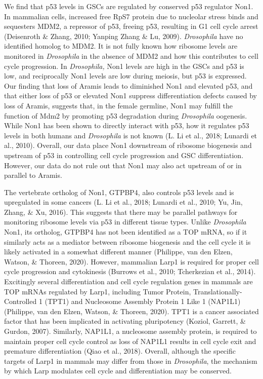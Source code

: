 \documentclass[12pt,oneside]{reedthesis}
\begin{document}
We find that p53 levels in GSCs are regulated by conserved p53 regulator
Non1. In mammalian cells, increased free RpS7 protein due to nucleolar
stress binds and sequesters MDM2, a repressor of p53, freeing p53,
resulting in G1 cell cycle arrest (Deisenroth \& Zhang, 2010; Yanping Zhang \& Lu, 2009). \emph{Drosophila} have no identified
homolog to MDM2. It is not fully known how ribosome levels are monitored
in \emph{Drosophila} in the absence of MDM2 and how this contributes to cell
cycle progression. In \emph{Drosophila,} Non1 levels are high in the GSCs and
p53 is low, and reciprocally Non1 levels are low during meiosis, but p53
is expressed. Our finding that loss of Aramis leads to diminished Non1
and elevated p53, and that either loss of p53 or elevated Non1 suppress
differentiation defects caused by loss of Aramis, suggests that, in the
female germline, Non1 may fulfill the function of Mdm2 by promoting p53
degradation during \emph{Drosophila} oogenesis. While Non1 has been shown to
directly interact with p53, how it regulates p53 levels in both humans
and \emph{Drosophila} is not known (L. Li et al., 2018; Lunardi et al., 2010). Overall,
our data place Non1 downstream of ribosome biogenesis and upstream of
p53 in controlling cell cycle progression and GSC differentiation.
However, our data do not rule out that Non1 may also act upstream of or
in parallel to Aramis.

The vertebrate ortholog of Non1, GTPBP4, also controls p53 levels and is
upregulated in some cancers (L. Li et al., 2018; Lunardi et al., 2010; Yu, Jin, Zhang, \& Xu, 2016). This suggests that there may be
parallel pathways for monitoring ribosome levels via p53 in different
tissue types. Unlike \emph{Drosophila} Non1, its ortholog, GTPBP4 has not
been identified as a TOP mRNA, so if it similarly acts as a mediator
between ribosome biogenesis and the cell cycle it is likely activated in
a somewhat different manner (Philippe, van den Elzen, Watson, \& Thoreen, 2020).
However, mammalian Larp1 is required for proper cell cycle progression
and cytokinesis (Burrows et al., 2010; Tcherkezian et al., 2014).
Excitingly several differentiation and cell cycle regulation genes in
mammals are TOP mRNAs regulated by Larp1, including Tumor Protein,
Translationally-Controlled 1 (TPT1) and Nucleosome Assembly Protein 1
Like 1 (NAP1L1) (Philippe, van den Elzen, Watson, \& Thoreen, 2020). TPT1 is a cancer
associated factor that has been implicated in activating pluripotency
(Koziol, Garrett, \& Gurdon, 2007). Similarly, NAP1L1, a
nucleosome assembly protein, is required to maintain proper cell cycle
control as loss of NAP1L1 results in cell cycle exit and premature
differentiation (Qiao et al., 2018). Overall, although
the specific targets of Larp1 in mammals may differ from those in
\emph{Drosophila}, the mechanism by which Larp modulates cell cycle and
differentiation may be conserved.
\end{document}
